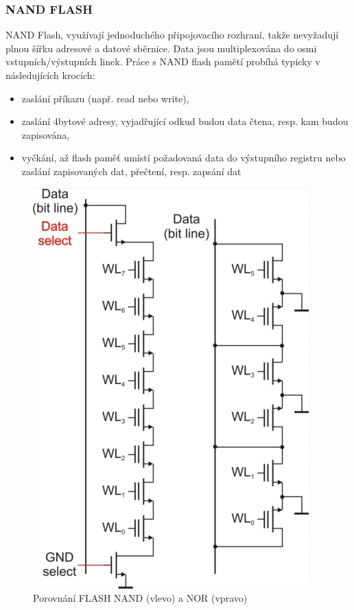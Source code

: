 \subsubsection{NAND FLASH}
NAND Flash, využívají jednoduchého připojovacího rozhraní, takže nevyžadují plnou šířku adresové a datové sběrnice. Data jsou multiplexována do osmi vstupních/výstupních linek. Práce s NAND flash pamětí probíhá typicky v následujících krocích:
\begin{itemize}
\item zaslání příkazu (např. read nebo write),
\item zaslání 4bytové adresy, vyjadřující odkud budou data
čtena, resp. kam budou zapisována,
\item vyčkání, až flash paměť umístí požadovaná data do
výstupního registru nebo zaslání zapisovaných dat,
přečtení, resp. zapsání dat
\end{itemize}
   \begin{figure}[h]
   \begin{center}
     \includegraphics[scale=0.6]{images/FLASH.png}
   \end{center}
   \caption{Porovnání FLASH NAND (vlevo) a NOR (vpravo)}
  \end{figure}
  
